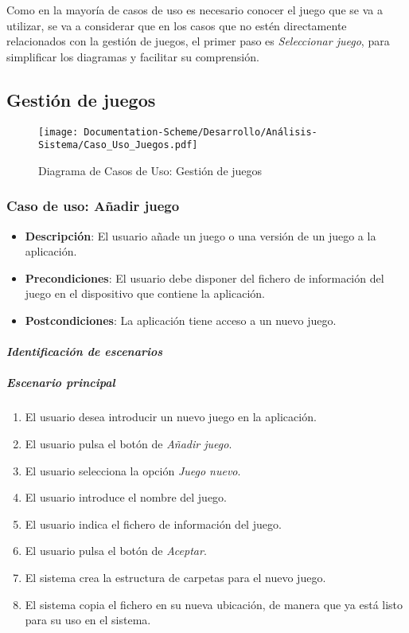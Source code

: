 Como en la mayoría de casos de uso es necesario conocer el juego que se va a utilizar, se va a considerar que en los casos 
que no estén directamente relacionados con la gestión de juegos, el primer paso es \textit{Seleccionar juego}, para simplificar 
los diagramas y facilitar su comprensión.

\subsection{Gestión de juegos}

\begin{figure}[H]
    \centering
    \texttt{[image: Documentation-Scheme/Desarrollo/Análisis-Sistema/Caso\_Uso\_Juegos.pdf]}
    \caption{Diagrama de Casos de Uso: Gestión de juegos}
    \label{Diagrama_gestión_juegos}    
\end{figure}


\subsubsection{Caso de uso: Añadir juego} 
\begin{itemize}
    \item \textbf{Descripción}: El usuario añade un juego o una versión de un juego a la aplicación.
    \item \textbf{Precondiciones}: El usuario debe disponer del fichero de información del juego en el 
    dispositivo que contiene la aplicación.
    \item \textbf{Postcondiciones}: La aplicación tiene acceso a un nuevo juego.
\end{itemize}

\paragraph{\textit{Identificación de escenarios}}
\subparagraph{Escenario principal}
\begin{enumerate}
    \item El usuario desea introducir un nuevo juego en la aplicación.
    \item El usuario pulsa el botón de \textit{Añadir juego}.
    \item El usuario selecciona la opción \textit{Juego nuevo}.
    \item El usuario introduce el nombre del juego.
    \item El usuario indica el fichero de información del juego.
    \item El usuario pulsa el botón de \textit{Aceptar}.
    \item El sistema crea la estructura de carpetas para el nuevo juego.
    \item El sistema copia el fichero en su nueva ubicación, de manera que ya está listo 
    para su uso en el sistema.
\end{enumerate}

